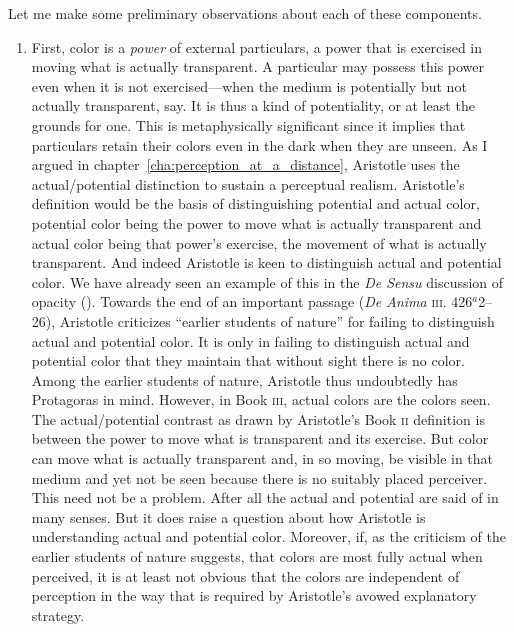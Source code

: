 Let me make some preliminary observations about each of these components.
\begin{enumerate}[(1)]
	\item First, color is a \emph{power} of external particulars, a power that is exercised in moving what is actually transparent. A particular may possess this power even when it is not exercised---when the medium is potentially but not actually transparent, say. It is thus a kind of potentiality, or at least the grounds for one. This is metaphysically significant since it implies that particulars retain their colors even in the dark when they are unseen. As I argued in chapter~\ref{cha:perception_at_a_distance}, Aristotle uses the actual/potential distinction to sustain a perceptual realism. Aristotle's definition would be the basis of distinguishing potential and actual color, potential color being the power to move what is actually transparent and actual color being that power's exercise, the movement of what is actually transparent. And indeed Aristotle is keen to distinguish actual and potential color. We have already seen an example of this in the \emph{De Sensu} discussion of opacity (\pageref{actual_potential}). Towards the end of an important passage (\emph{De Anima} \textsc{iii}. 426\( ^{a} \)2--26), Aristotle criticizes ``earlier students of nature'' for failing to distinguish actual and potential color. It is only in failing to distinguish actual and potential color that they maintain that without sight there is no color. Among the earlier students of nature, Aristotle thus undoubtedly has Protagoras in mind. However, in Book \textsc{iii}, actual colors are the colors seen. The actual/potential contrast as drawn by Aristotle's Book \textsc{ii} definition is between the power to move what is transparent and its exercise. But color can move what is actually transparent and, in so moving, be visible in that medium and yet not be seen because there is no suitably placed perceiver. This need not be a problem. After all the actual and potential are said of in many senses. But it does raise a question about how Aristotle is understanding actual and potential color. Moreover, if, as the criticism of the earlier students of nature suggests, that colors are most fully actual when perceived, it is at least not obvious that the colors are independent of perception in the way that is required by Aristotle's avowed explanatory strategy.

\end{enumerate}
